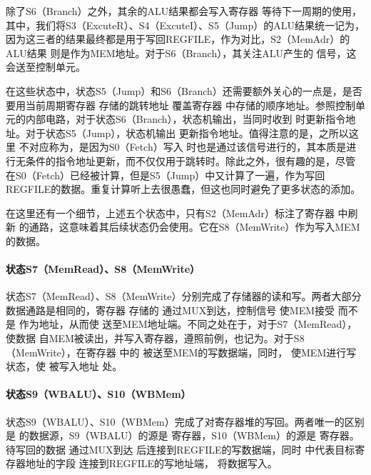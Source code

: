 除了S6（Branch）之外，其余的ALU结果都会写入寄存器 等待下一周期的使用，其中，我们将S3（ExcuteR）、S4（ExcuteI）、S5（Jump）的ALU结果统一记为，因为这三者的结果最终都是用于写回REGFILE，作为对比，S2（MemAdr）的ALU结果 则是作为MEM地址。对于S6（Branch），其关注ALU产生的 信号，这会送至控制单元。

在这些状态中，状态S5（Jump）和S6（Branch）还需要额外关心的一点是，是否要用当前周期寄存器 存储的跳转地址 覆盖寄存器 中存储的顺序地址。参照控制单元的内部电路，对于状态S6（Branch），状态机输出，当同时收到 时更新指令地址。对于状态S5（Jump），状态机输出 更新指令地址。值得注意的是，之所以这里 不对应称为，是因为S0（Fetch）写入 时也是通过该信号进行的，其本质是进行无条件的指令地址更新，而不仅仅用于跳转时。除此之外，很有趣的是，尽管 在S0（Fetch）已经被计算，但是S5（Jump）中又计算了一遍，作为写回REGFILE的数据。重复计算听上去很愚蠢，但这也同时避免了更多状态的添加。

在这里还有一个细节，上述五个状态中，只有S2（MemAdr）标注了寄存器 中刷新 的通路，这意味着其后续状态仍会使用。它在S8（MemWrite）作为写入MEM的数据。

\paragraph{状态S7（MemRead）、S8（MemWrite）}
状态S7（MemRead）、S8（MemWrite）分别完成了存储器的读和写。两者大部分数据通路是相同的，寄存器 存储的 通过MUX到达，控制信号 使MEM接受 而不是 作为地址，从而使 送至MEM地址端。不同之处在于，对于S7（MemRead）， 使数据\codex{[imm(rs1)]} 自MEM被读出，并写入寄存器，遵照前例，也记为。对于S8（MemWrite），在寄存器 中的 被送至MEM的写数据端，同时， 使MEM进行写状态，使 被写入地址 处。

\paragraph{状态S9（WBALU）、S10（WBMem）}
状态S9（WBALU）、S10（WBMem）完成了对寄存器堆的写回。两者唯一的区别是 的数据源，S9（WBALU）的源是 寄存器，S10（WBMem）的源是 寄存器。待写回的数据 通过MUX到达 后连接到REGFILE的写数据端，同时 中代表目标寄存器地址的字段 连接到REGFILE的写地址端， 将数据写入。

